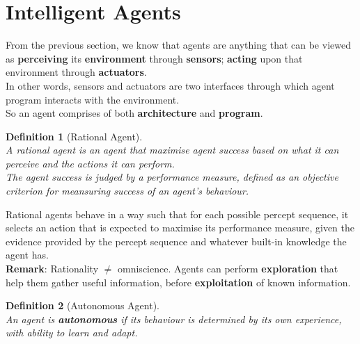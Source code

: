 \documentclass[12pt]{article}
\newtheorem{definition}{Definition}[section]
\theoremstyle{definition}
\begin{document}
\section{Intelligent Agents}
From the previous section, we know that agents are anything that can be viewed as \textbf{perceiving} its \textbf{environment} through \textbf{sensors}; \textbf{acting} upon that environment through \textbf{actuators}.\\
In other words, sensors and actuators are two interfaces through which agent program interacts with the environment. \\So an agent comprises of both \textbf{architecture} and \textbf{program}.
\begin{definition}[Rational Agent]
\hfill\\\normalfont A rational agent is an agent that maximise agent success based on what it can perceive and the actions it can perform.\\The agent success is judged by a performance measure, defined as an objective criterion for meansuring success of an agent's behaviour.
\end{definition}
Rational agents behave in a way such that for each possible percept sequence, it selects an action that is expected to maximise its performance measure, given the evidence provided by the percept sequence and whatever built-in knowledge the agent has.\\
\textbf{Remark}: Rationality $\neq$ omniscience. Agents can perform \textbf{exploration} that help them gather useful information, before \textbf{exploitation} of known information.
\begin{definition}[Autonomous Agent]
\hfill\\\normalfont An agent is \textbf{autonomous} if its behaviour is determined by its own experience, with ability to learn and adapt.
\end{definition}
\end{document}
